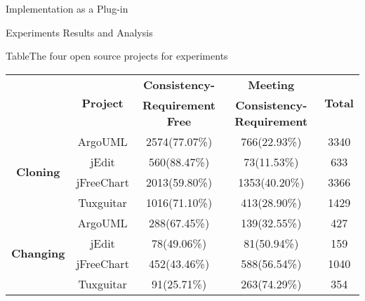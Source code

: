 {Implementation as a Plug-in}


{Experiments Results and Analysis}

\begin{table*}[ht]
{Table$\!$}{The four open source projects for experiments}
\vspace{0.5em}
\centering
\wuhao
\begin{tabular}{ccccc}
\toprule[1.5pt]
~\multirow{2}{*}{\textbf{Instances}}&\multirow{2}{*}{\textbf{Project}}&\textbf{Consistency-} &\textbf{Meeting} &\multirow{2}{*}{\textbf{Total}}\\
~&~&\textbf{Requirement Free}&\textbf{Consistency-Requirement}&~\\
\midrule[1pt]
\multirow{4}{*}{\textbf{Cloning}}
&ArgoUML&	2574(77.07\%)&	766(22.93\%)&	3340\\
&jEdit&560(88.47\%)&	73(11.53\%)&	633\\
&jFreeChart&	2013(59.80\%)&	1353(40.20\%)&	3366\\
&Tuxguitar&	1016(71.10\%)&	413(28.90\%)&	1429\\
\hline
\multirow{4}{*}{\textbf{Changing}}
&ArgoUML&288(67.45\%)&139(32.55\%)&427\\
&jEdit&78(49.06\%)&81(50.94\%)&159\\
&jFreeChart&452(43.46\%)&588(56.54\%)&1040\\
&Tuxguitar&91(25.71\%)&263(74.29\%)&354\\
\bottomrule[1.5pt]
\end{tabular}
\end{table*}

